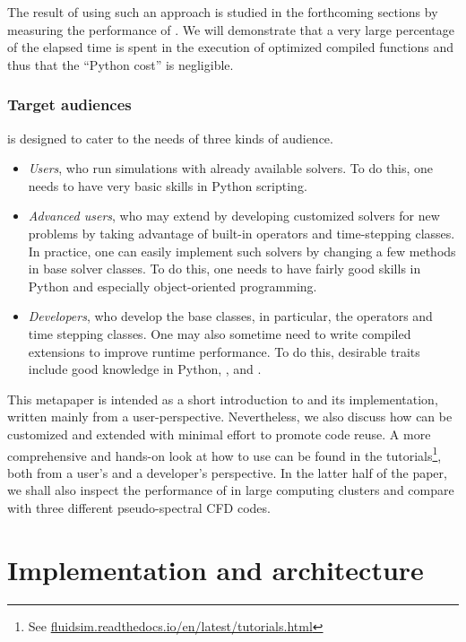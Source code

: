 \documentclass{../jors}
\begin{document}
The result of using such an approach is studied in the forthcoming sections by
measuring the performance of .
%
We will demonstrate that a very large percentage of the elapsed time is spent in
the execution of optimized compiled functions and thus that the ``Python cost'' is
negligible.


\subsubsection*{Target audiences}
 is designed to cater to the needs of three kinds of audience.
\begin{itemize}
\item \emph{Users}, who run simulations with already available solvers. To do
this, one needs to have very basic skills in Python scripting.
\item \emph{Advanced users}, who may extend  by developing
customized solvers for new problems by taking advantage of built-in operators and
time-stepping classes.  In practice, one can easily implement such solvers by
changing a few methods in base solver classes.  To do this, one needs to have
fairly good skills in Python and especially object-oriented programming.
\item \emph{Developers}, who develop the base classes, in particular, the
operators and time stepping classes.  One may also sometime need to write compiled
extensions to improve runtime performance. To do this, desirable traits include
good knowledge in Python, \Numpy,  and .
\end{itemize}

This metapaper is intended as a short introduction to  and its
implementation, written mainly from a user-perspective. Nevertheless, we also discuss how
 can be customized and extended with minimal effort to promote code
reuse.
%
A more comprehensive and hands-on look at how to use  can be found
in the tutorials\footnote{See
\href{https://fluidsim.readthedocs.io/en/latest/tutorials.html}{fluidsim.readthedocs.io/en/latest/tutorials.html}},
both from a user's and a developer's perspective.
%
In the latter half of the paper, we shall also inspect the performance of
 in large computing clusters and compare  with three
different pseudo-spectral CFD codes.

\section*{Implementation and architecture}
\end{document}
